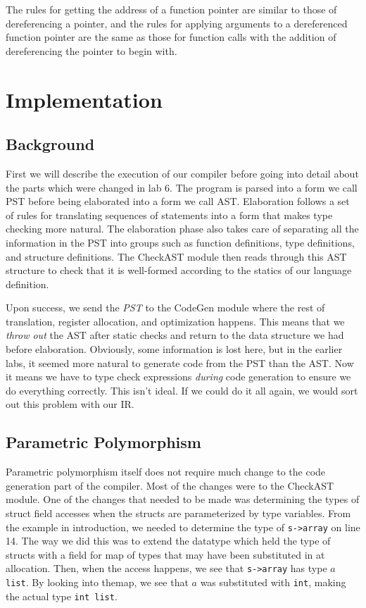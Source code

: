 \documentclass[aps,letterpaper,11pt]{revtex4}
\begin{document}
The rules for getting the address of a function pointer are similar to those
of dereferencing a pointer, and the rules for applying arguments to a
dereferenced function pointer are the same as those for function calls with
the addition of dereferencing the pointer to begin with.

\newpage
\section{Implementation}
\subsection{Background}
First we will describe the execution of our compiler before going into detail about the parts which were changed
in lab 6. The program is parsed into a form we call PST before being elaborated into a form we call AST. 
Elaboration follows a set of rules for translating sequences of statements into a form that makes type checking
more natural. The elaboration phase also takes care of separating all the information in the PST into groups
such as function definitions, type definitions, and structure definitions. The CheckAST module then reads
through this AST structure to check that it is well-formed according to the statics of our language definition.

Upon success, we send the \emph{PST} to the CodeGen module where the rest of
translation, register allocation, and optimization happens. This means that we
\emph{throw out} the AST after static checks and return to the data structure
we had before elaboration. Obviously, some information is lost here, but in
the earlier labs, it seemed more natural to generate code from the PST than
the AST. Now it means we have to type check expressions \emph{during} code
generation to ensure we do everything correctly. This isn't ideal. If we could 
do it all again, we would sort out this problem with our IR.

\subsection{Parametric Polymorphism}
Parametric polymorphism itself does not require much change to the code
generation part of the compiler. Most of the changes were to the CheckAST
module. One of the changes that needed to be made was determining the types
of struct field accesses when the structs are parameterized by type variables.
From the example in introduction, we needed to determine the type of
\texttt{s->array} on line 14. The way we did this was to extend the datatype
which held the type of structs with a field for map of types that may have
been substituted in at allocation. Then, when the access happens, we see that
\texttt{s->array} has type \texttt{$a$ list}. By looking into themap, we see
that $a$ was substituted with \texttt{int}, making the actual type
\texttt{int list}.
\end{document}
